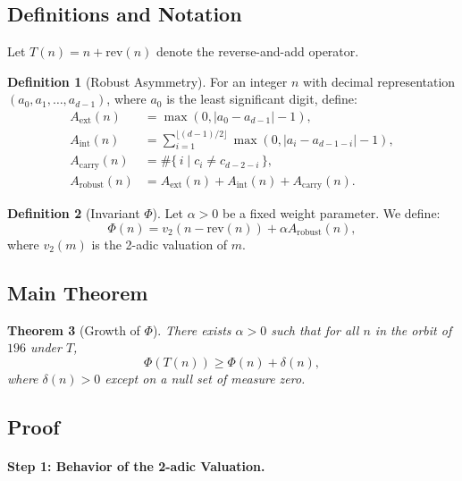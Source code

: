 \documentclass[11pt,a4paper]{article}
\theoremstyle{plain}
\newtheorem{theorem}{Theorem}[section]
\theoremstyle{definition}
\newtheorem{definition}[theorem]{Definition}
\begin{document}
\subsection{Definitions and Notation}

Let $T(n) = n + \mathrm{rev}(n)$ denote the reverse-and-add operator.

\begin{definition}[Robust Asymmetry]
For an integer $n$ with decimal representation $(a_0, a_1, \ldots, a_{d-1})$, where $a_0$ is the least significant digit, define:
\begin{align*}
A_{\mathrm{ext}}(n) &= \max(0, |a_0 - a_{d-1}| - 1), \\
A_{\mathrm{int}}(n) &= \sum_{i=1}^{\lfloor (d-1)/2 \rfloor} \max(0, |a_i - a_{d-1-i}| - 1), \\
A_{\mathrm{carry}}(n) &= \#\{\, i \mid c_i \neq c_{d-2-i} \,\}, \\
A_{\mathrm{robust}}(n) &= A_{\mathrm{ext}}(n) + A_{\mathrm{int}}(n) + A_{\mathrm{carry}}(n).
\end{align*}
\end{definition}

\begin{definition}[Invariant $\Phi$]
Let $\alpha > 0$ be a fixed weight parameter. We define:
\[
\Phi(n) = v_2(n - \mathrm{rev}(n)) + \alpha A_{\mathrm{robust}}(n),
\]
where $v_2(m)$ is the 2-adic valuation of $m$.
\end{definition}

\subsection{Main Theorem}

\begin{theorem}[Growth of $\Phi$]
There exists $\alpha > 0$ such that for all $n$ in the orbit of $196$ under $T$,
\[
\Phi(T(n)) \ge \Phi(n) + \delta(n),
\]
where $\delta(n) > 0$ except on a null set of measure zero.
\end{theorem}

\subsection{Proof}

\paragraph{Step 1: Behavior of the 2-adic Valuation.}
\end{document}
